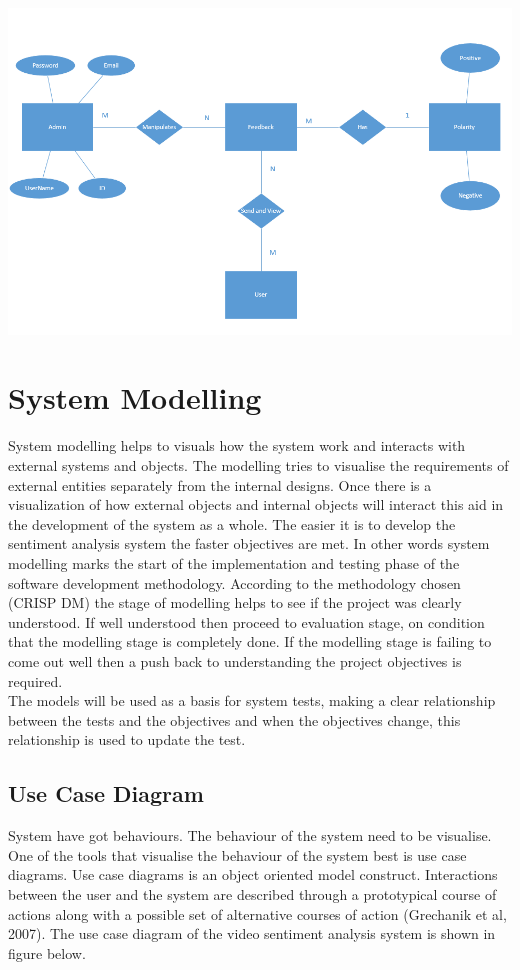 \documentclass[12pt]{report}
\begin{document}
	\includegraphics[scale=0.5]{erd.PNG}
	
		
	\section{System Modelling}
System modelling helps to visuals how the system work and interacts with external systems and objects. The modelling tries to visualise the requirements of external entities separately from the internal designs. Once there is a visualization of how external objects and internal objects will interact this aid in the development of the system as a whole. The easier it is to develop the sentiment analysis system the faster objectives are met. In other words system modelling marks the start of the implementation and testing phase of the software development methodology. According to the methodology chosen (CRISP DM) the stage of modelling helps to see if the project was clearly understood. If well understood then proceed to evaluation stage, on condition that the modelling stage is completely done. If the modelling stage is failing to come out well then a push back to understanding the project objectives is required.\\ 
The models will be used as a basis for system tests, making a clear relationship between the tests and the objectives and when the objectives change, this relationship is used to update the test.\\ 
	
	\subsection{Use Case Diagram}
	System have got behaviours. The behaviour of the system need to be visualise. One of the tools that visualise the behaviour of the system best is use case diagrams. Use case diagrams is an object oriented model construct. 
	Interactions between the user and the system are described through a prototypical course of actions along with a possible set of alternative courses of action (Grechanik et al, 2007). The use case diagram of the video sentiment analysis system is shown in figure below.\\
	
\end{document}
